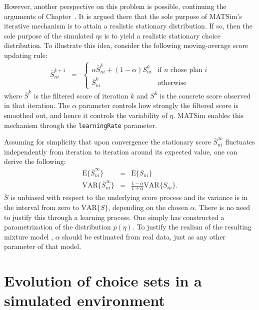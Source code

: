 However, another perspective on this problem is possible, continuing
the arguments of Chapter~. It is argued there that
the sole purpose of MATSim's iterative mechanism is to attain a realistic
stationary distribution. If so, then the sole purpose of the simulated
$\eta$s is to yield a realistic stationary choice distribution. To
illustrate this idea, consider the following moving-average score
updating rule:
\begin{eqnarray}
\bar{S}_{ni}^{k+1} & = & \begin{cases}
\alpha\bar{S}_{ni}^{k}+(1-\alpha)S_{ni}^{k} & \text{if }n\text{ chose plan }i\\
\bar{S}_{ni}^{k} & \text{otherwise}
\end{cases}
\end{eqnarray}
where $\bar{S}^{k}$ is the filtered score of iteration $k$ and $S^{k}$
is the concrete score observed in that iteration. The $\alpha$ parameter
controls how strongly the filtered score is smoothed out, and hence
it controls the variability of $\eta$. MATSim enables this mechanism
through the \lstinline{learningRate} parameter.

Assuming for simplicity that upon convergence the stationary score
$\bar{S}_{ni}^{\infty}$ fluctuates independently from iteration to
iteration around its expected value, one can derive the following:
\begin{eqnarray}
\text{E}\{\bar{S}_{ni}^{\infty}\} & = & \text{E}\{S_{ni}\}\\
\text{VAR}\{\bar{S}_{ni}^{\infty}\} & = & \frac{1-\alpha}{1+\alpha}\text{VAR}\{S_{ni}\}.
\end{eqnarray}
$\bar{S}$ is unbiased with respect to the underlying score process
and its variance is in the interval from zero to $\text{VAR}\{S\}$,
depending on the chosen $\alpha$. There is no need to justify this
through a learning process. One simply has constructed a parametrization
of the distribution $p(\eta)$. To justify the realism of the resulting
mixture model , $\alpha$ should be
estimated from real data, just as any other parameter of that model.


\section{\label{sec:Evolution-of-choice}Evolution of choice sets in a simulated
environment}


